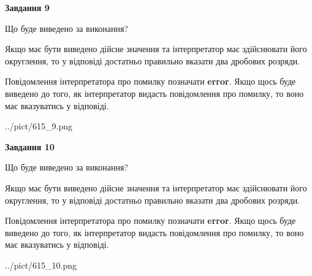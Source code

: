 \documentclass[12pt, ukrainian]{article}
\begin{document}
{\begin {Large}
{\begin {center}\textbf{Завдання 9}\end {center}}\par
Що буде виведено за виконання? \par

Якщо має бути виведено дійсне значення та інтерпретатор має здійснювати його округлення, 
то у відповіді достатньо правильно вказати два дробових розряди.

Повідомлення інтерпретатора про помилку позначати \textbf{error}.
Якщо щось буде виведено до того, як інтерпретатор видасть повідомлення про помилку, 
то воно має вказуватись у відповіді. \par

\begin{center}
	{../pict/615_9.png}
\end{center}
\newpage

{\begin {center}\textbf{Завдання 10}\end {center}}\par
Що буде виведено за виконання? \par

Якщо має бути виведено дійсне значення та інтерпретатор має здійснювати його округлення, 
то у відповіді достатньо правильно вказати два дробових розряди.

Повідомлення інтерпретатора про помилку позначати \textbf{error}.
Якщо щось буде виведено до того, як інтерпретатор видасть повідомлення про помилку, 
то воно має вказуватись у відповіді. \par

\begin{center}
	{../pict/615_10.png}
\end{center}
\newpage

\end {Large}}
\end{document}
